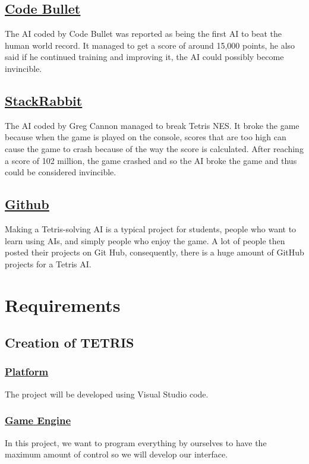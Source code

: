 \documentclass[conference]{IEEEtran}
\begin{document}
\subsection{\href{https://www.youtube.com/watch?v=QOJfyp0KMmM}{\underline{Code Bullet}}}
The AI coded by Code Bullet was reported as being the first AI to beat the human world record. It managed to get a score of around 15,000 points, he also said if he continued training and improving it, the AI could possibly become invincible.
\subsection{\href{https://www.youtube.com/watch?v=l_KY_EwZEVA}{\underline{StackRabbit}}}
The AI coded by Greg Cannon managed to break Tetris NES. It broke the game because when the game is played on the console, scores that are too high can cause the game to crash because of the way the score is calculated. After reaching a score of 102 million, the game crashed and so the AI broke the game and thus could be considered invincible.
\subsection{\href{https://github.com/search?q=tetrisai&type=repositories}{\underline{Github}}}
Making a Tetris-solving AI is a typical project for students, people who want to learn using AIs, and simply people who enjoy the game. A lot of people then posted their projects on Git Hub, consequently, there is a huge amount of GitHub projects for a Tetris AI.

\section{Requirements}

\subsection{Creation of TETRIS}

\subsubsection{\underline{Platform}}
The project will be developed using Visual Studio code.
\subsubsection{\underline{Game Engine}}
In this project, we want to program everything by ourselves to have the maximum amount of control so we will develop our interface.
\end{document}
